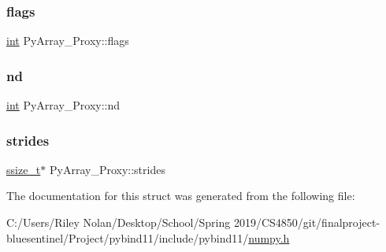 \subsubsection{\texorpdfstring{flags}{flags}}
{\footnotesize\ttfamily \mbox{\hyperlink{warnings_8h_a74f207b5aa4ba51c3a2ad59b219a423b}{int}} Py\+Array\+\_\+\+Proxy\+::flags}

\mbox{\label{struct_py_array___proxy_ae92334a4a5bfa2f9aed55a51857d74d3}} 
\subsubsection{\texorpdfstring{nd}{nd}}
{\footnotesize\ttfamily \mbox{\hyperlink{warnings_8h_a74f207b5aa4ba51c3a2ad59b219a423b}{int}} Py\+Array\+\_\+\+Proxy\+::nd}

\mbox{\label{struct_py_array___proxy_a7519a8fe4dd43c5de7ee7d8d271e97c8}} 
\subsubsection{\texorpdfstring{strides}{strides}}
{\footnotesize\ttfamily \mbox{\hyperlink{detail_2common_8h_ac430d16fc097b3bf0a7469cfd09decda}{ssize\+\_\+t}}$\ast$ Py\+Array\+\_\+\+Proxy\+::strides}



The documentation for this struct was generated from the following file\+:\begin{DoxyCompactItemize}
\item 
C\+:/\+Users/\+Riley Nolan/\+Desktop/\+School/\+Spring 2019/\+C\+S4850/git/finalproject-\/bluesentinel/\+Project/pybind11/include/pybind11/\mbox{\hyperlink{numpy_8h}{numpy.\+h}}\end{DoxyCompactItemize}
